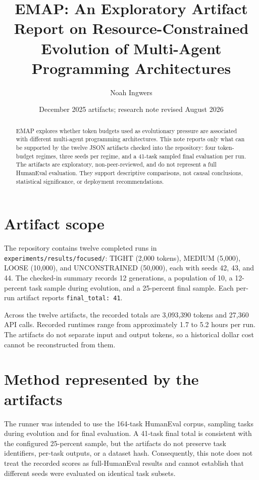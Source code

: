 \documentclass[11pt]{article}
\title{EMAP: An Exploratory Artifact Report on Resource-Constrained
Evolution of Multi-Agent Programming Architectures}
\author{Noah Ingwers}
\date{December 2025 artifacts; research note revised August 2026}
\begin{document}
\maketitle

\begin{abstract}
EMAP explores whether token budgets used as evolutionary pressure are
associated with different multi-agent programming architectures. This note
reports only what can be supported by the twelve JSON artifacts checked into
the repository: four token-budget regimes, three seeds per regime, and a
41-task sampled final evaluation per run. The artifacts are exploratory,
non-peer-reviewed, and do not represent a full HumanEval evaluation. They
support descriptive comparisons, not causal conclusions, statistical
significance, or deployment recommendations.
\end{abstract}

\section{Artifact scope}

The repository contains twelve completed runs in
\texttt{experiments/results/focused/}: TIGHT (2,000 tokens), MEDIUM (5,000),
LOOSE (10,000), and UNCONSTRAINED (50,000), each with seeds 42, 43, and 44.
The checked-in summary records 12 generations, a population of 10, a
12-percent task sample during evolution, and a 25-percent final sample. Each
per-run artifact reports \texttt{final\_total: 41}.

Across the twelve artifacts, the recorded totals are 3,093,390 tokens and
27,360 API calls. Recorded runtimes range from approximately 1.7 to 5.2 hours
per run. The artifacts do not separate input and output tokens, so a historical
dollar cost cannot be reconstructed from them.

\section{Method represented by the artifacts}

The runner was intended to use the 164-task HumanEval corpus, sampling tasks
during evolution and for final evaluation. A 41-task final total is consistent
with the configured 25-percent sample, but the artifacts do not preserve task
identifiers, per-task outputs, or a dataset hash. Consequently, this note does
not treat the recorded scores as full-HumanEval results and cannot establish
that different seeds were evaluated on identical task subsets.
\end{document}
